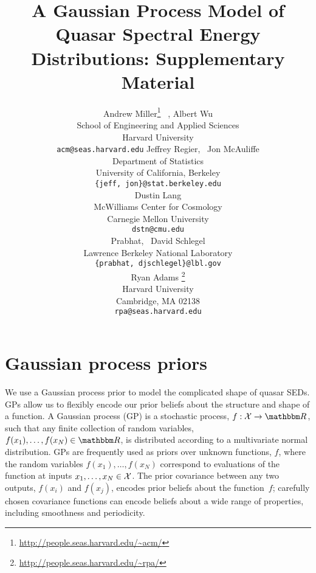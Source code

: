 \documentclass{article} %
\title{A Gaussian Process Model of Quasar Spectral Energy Distributions: Supplementary Material}
\author{
Andrew Miller\thanks{\url{http://people.seas.harvard.edu/\~acm/}} \, ,  Albert Wu \\
School of Engineering and Applied Sciences\\
Harvard University\\
\texttt{acm@seas.harvard.edu}
\And
Jeffrey Regier, \, Jon McAuliffe \\
Department of Statistics \\
University of California, Berkeley \\
\texttt{\{jeff, jon\}@stat.berkeley.edu} \\
\And
Dustin Lang \\
McWilliams Center for Cosmology \\
Carnegie Mellon University \\
\texttt{dstn@cmu.edu} \\
\And
Prabhat, \, David Schlegel \\
Lawrence Berkeley National Laboratory \\
\texttt{\{prabhat, djschlegel\}@lbl.gov} \\
\And
Ryan Adams \thanks{\url{http://people.seas.harvard.edu/\~rpa/}}\\
Harvard University\\
Cambridge, MA 02138 \\
\texttt{rpa@seas.harvard.edu} \\
}
\begin{document}
\maketitle

%

\section{Gaussian process priors}
We use a Gaussian process prior to model the complicated shape of quasar SEDs.  GPs allow us to flexibly encode our prior beliefs about the structure and shape of a function. 
A Gaussian process (GP) is a stochastic process, ${f: \mathcal{X} \rightarrow \R}$, such that any finite collection of random variables, ${f(x_1),\dots, f(x_N) \in \R}$, is distributed according to a multivariate normal distribution.  
GPs are frequently used as priors over unknown functions, $f$, where the random variables $f(x_1), \dots, f(x_N)$ correspond to evaluations of the function at inputs ${x_1, \dots, x_N \in \mathcal{X}}$.  
The prior covariance between any two outputs, $f(x_i)$ and $f(x_j)$, encodes prior beliefs about the function~$f$; carefully chosen covariance functions can encode beliefs about a wide range of properties, including smoothness and periodicity.  
\end{document}
